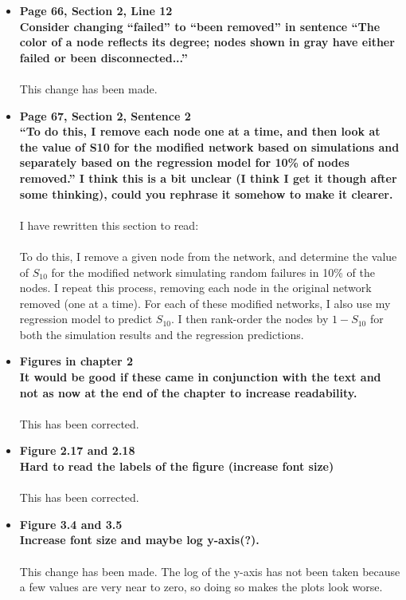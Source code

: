 \documentclass[a4paper,10pt]{article}
\begin{document}
\begin{itemize}
 \item \textbf{Page 66, Section 2, Line 12 \\
 Consider changing ``failed'' to ``been removed'' in sentence ``The color of a node reflects its degree; nodes shown in gray have either failed or been disconnected...''}\\
 \\
 This change has been made.
 
 \item \textbf{Page 67, Section 2, Sentence 2 \\
 ``To do this, I remove each node one at a time, and then look at the value of S10 for the modified network based on simulations and separately based on the regression model for 10\% of nodes removed.'' I think this is a bit unclear (I think I get it though after some thinking), could you rephrase it somehow to make it clearer.}\\
 \\
 I have rewritten this section to read:\\
 \\
 To do this, I remove a given node from the network, and determine the value of $S_{10}$ for the modified network simulating random failures in 10\% of the nodes. I repeat this process, removing each node in the original network removed (one at a time). For each of these modified networks, I also use my regression model to predict $S_{10}$. I then rank-order the nodes by $1-S_{10}$ for both the simulation results and the regression predictions.
 
 \item \textbf{Figures in chapter 2 \\
 It would be good if these came in conjunction with the text and not as now at the end of the chapter to increase readability.}\\
 \\
 This has been corrected.
 
 \item \textbf{Figure 2.17 and 2.18 \\
 Hard to read the labels of the figure (increase font size)}\\
 \\
 This has been corrected.
 
 \item \textbf{Figure 3.4 and 3.5 \\
 Increase font size and maybe log y-axis(?).}\\
 \\
 This change has been made.  The log of the y-axis has not been taken because a few values are very near to zero, so doing so makes the plots look worse.
 
\end{itemize}
\end{document}
